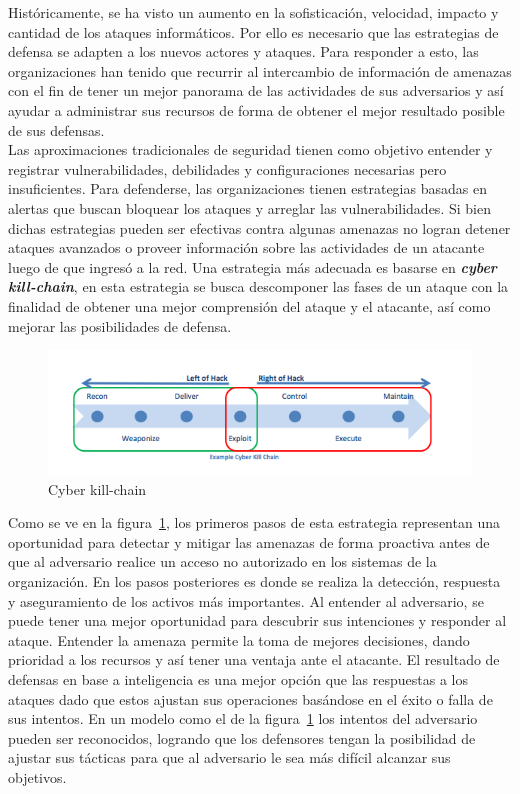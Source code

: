Históricamente, se ha visto un aumento en la sofisticación, velocidad, impacto y 
cantidad de los ataques informáticos. Por ello es necesario que las estrategias 
de defensa se adapten a los nuevos actores y ataques. Para responder a esto, las 
organizaciones han tenido que recurrir al intercambio de información de amenazas 
con el fin de tener un mejor panorama de las actividades de sus adversarios 
y así ayudar a administrar sus recursos de forma de obtener el mejor resultado 
posible de sus defensas. \\

Las aproximaciones tradicionales de seguridad tienen como objetivo entender y 
registrar vulnerabilidades, debilidades y configuraciones necesarias pero 
insuficientes. Para defenderse, las organizaciones tienen estrategias basadas en 
alertas que buscan bloquear los ataques y arreglar las vulnerabilidades. Si bien dichas estrategias pueden ser efectivas contra algunas 
amenazas no logran detener ataques avanzados o proveer información sobre las 
actividades de un atacante luego de que ingresó a la red. Una estrategia más 
adecuada es basarse en \textbf{\textit{cyber kill-chain}}, en esta estrategia se busca 
descomponer las fases de un ataque con la finalidad de obtener una mejor 
comprensión del ataque y el atacante, así como mejorar las posibilidades de 
defensa.

\begin{figure}[H]
  \label{fig:kill_chain}
  \centering
  \includegraphics[scale=0.55]{./images/killChain.png}
    \caption{Cyber kill-chain \protect\cite{b1}}
\end{figure}

Como se ve en la figura~\ref{fig:kill_chain}, los primeros pasos de esta estrategia representan una 
oportunidad para detectar y mitigar las amenazas de forma proactiva antes de que 
al adversario realice un acceso no autorizado en los sistemas de la 
organización. En los pasos posteriores es donde se realiza la detección, 
respuesta y aseguramiento de los activos más importantes. Al entender al 
adversario, se puede tener una mejor oportunidad para descubrir sus intenciones 
y responder al ataque. Entender la amenaza permite la toma de mejores 
decisiones, dando prioridad a los recursos y así tener una ventaja ante el atacante. 
El resultado de defensas en base a inteligencia es una mejor opción que las 
respuestas a los ataques dado que estos ajustan sus operaciones basándose en el 
éxito o falla de sus intentos. En un modelo como el de la figura~\ref{fig:kill_chain} los intentos 
del adversario pueden ser reconocidos, logrando que los defensores tengan la 
posibilidad de ajustar sus tácticas para que al adversario le sea más 
difícil alcanzar sus objetivos.\\

